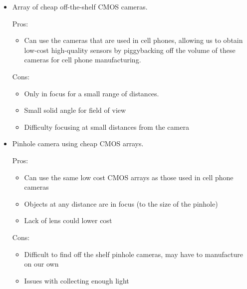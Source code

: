 \documentclass[10pt]{article}
\begin{document}
\begin{itemize}
\item Array of cheap off-the-shelf CMOS cameras. 

Pros:
\begin{itemize}
\item Can use the cameras that are used in cell phones, allowing us to obtain low-cost high-quality sensors by piggybacking off the volume of these cameras for cell phone manufacturing.
\end{itemize}

Cons:
\begin{itemize}
\item Only in focus for a small range of distances.
\item Small solid angle for field of view
\item Difficulty focusing at small distances from the camera
\end{itemize}

\item Pinhole camera using cheap CMOS arrays.

Pros:
\begin{itemize}
\item Can use the same low cost CMOS arrays as those used in cell phone cameras
\item Objects at any distance are in focus (to the size of the pinhole)
\item Lack of lens could lower cost
\end{itemize}

Cons:
\begin{itemize}
\item Difficult to find off the shelf pinhole cameras, may have to manufacture on our own
\item Issues with collecting enough light
\end{itemize}

\end{itemize}
\end{document}
